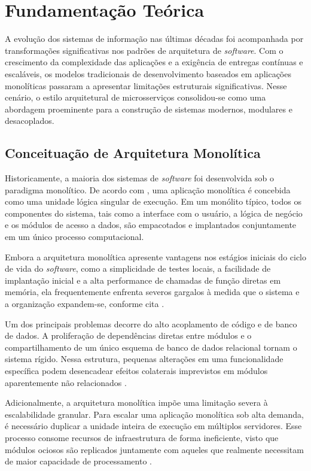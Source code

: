 
\chapter{Fundamentação Teórica}

A evolução dos sistemas de informação nas últimas décadas foi acompanhada por transformações significativas nos padrões de arquitetura de \textit{software}. Com o crescimento da complexidade das aplicações e a exigência de entregas contínuas e escaláveis, os modelos tradicionais de desenvolvimento baseados em aplicações monolíticas passaram a apresentar limitações estruturais significativas. Nesse cenário, o estilo arquitetural de microsserviços consolidou-se como uma abordagem proeminente para a construção de sistemas modernos, modulares e desacoplados.

\section{Conceituação de Arquitetura Monolítica}

Historicamente, a maioria dos sistemas de \textit{software} foi desenvolvida sob o paradigma monolítico. De acordo com , uma aplicação monolítica é concebida como uma unidade lógica singular de execução. Em um monólito típico, todos os componentes do sistema, tais como a interface com o usuário, a lógica de negócio e os módulos de acesso a dados, são empacotados e implantados conjuntamente em um único processo computacional.

Embora a arquitetura monolítica apresente vantagens nos estágios iniciais do ciclo de vida do \textit{software}, como a simplicidade de testes locais, a facilidade de implantação inicial e a alta performance de chamadas de função diretas em memória, ela frequentemente enfrenta severos gargalos à medida que o sistema e a organização expandem-se, conforme cita \cite{newman2021}. 

Um dos principais problemas decorre do alto acoplamento de código e de banco de dados. A proliferação de dependências diretas entre módulos e o compartilhamento de um único esquema de banco de dados relacional tornam o sistema rígido. Nessa estrutura, pequenas alterações em uma funcionalidade específica podem desencadear efeitos colaterais imprevistos em módulos aparentemente não relacionados \cite{richardson2018}.

Adicionalmente, a arquitetura monolítica impõe uma limitação severa à escalabilidade granular. Para escalar uma aplicação monolítica sob alta demanda, é necessário duplicar a unidade inteira de execução em múltiplos servidores. Esse processo consome recursos de infraestrutura de forma ineficiente, visto que módulos ociosos são replicados juntamente com aqueles que realmente necessitam de maior capacidade de processamento \cite{lewis2014}.

